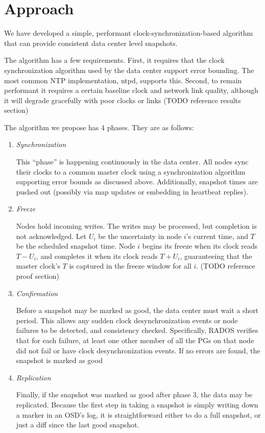 \chapter{Approach}
\label{sec:approach}

We have developed a simple, performant clock-synchronization-based
algorithm that can provide consistent data center level snapshots.

The algorithm has a few requirements. First, it requires that the
clock synchronization algorithm used by the data center support error
bounding. The most common NTP implementation, ntpd, supports
this. Second, to remain performant it requires a certain baseline
clock and network link quality, although it will degrade gracefully
with poor clocks or links (TODO reference results section)

The algorithm we propose has 4 phases. They are as follows:

\begin{enumerate}

\item \emph{Synchronization}

  This “phase” is happening continuously in the data center. All nodes
  sync their clocks to a common master clock using a synchronization
  algorithm supporting error bounds as discussed above. Additionally,
  snapshot times are pushed out (possibly via map updates or embedding
  in heartbeat replies).

\item \emph{Freeze}
  
  Nodes hold incoming writes. The writes may be processed, but
  completion is not acknowledged. Let $U_i$ be the uncertainty in node
  $i$’s current time, and $T$ be the scheduled snapshot time. Node $i$
  begins its freeze when its clock reads $T - U_i$, and completes it
  when its clock reads $T + U_i$, guaranteeing that the master clock’s
  $T$ is captured in the freeze window for all $i$. (TODO reference
  proof section)

\item \emph{Confirmation}

  Before a snapshot may be marked as good, the data center must wait a
  short period. This allows any sudden clock desynchronization events
  or node failures to be detected, and consistency
  checked. Specifically, RADOS verifies that for each failure, at
  least one other member of all the PGs on that node did not fail or
  have clock desynchronization events. If no errors are found, the
  snapshot is marked as good

\item \emph{Replication}
  
  Finally, if the snapshot was marked as good after phase 3, the data
  may be replicated. Because the first step in taking a snapshot is
  simply writing down a marker in an OSD’s log, it is straightforward
  either to do a full snapshot, or just a diff since the last good
  snapshot.

\end{enumerate}
